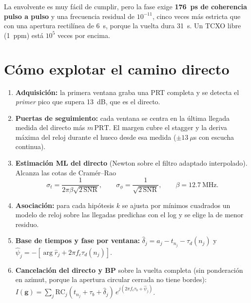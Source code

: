 \documentclass[11pt,a4paper]{article}
\begin{document}
La envolvente es muy fácil de cumplir, pero la fase exige \textbf{176~ps
de coherencia pulso a pulso} y una frecuencia residual de $10^{-11}$, cinco
veces más estricta que con una apertura rectilínea de 6~s, porque la vuelta
dura 31~s. Un TCXO libre (1~ppm) está $10^5$ veces por encima.

\section{Cómo explotar el camino directo}
\label{sec:alg}

\begin{enumerate}
\item \textbf{Adquisición:} la primera ventana graba una PRT completa y se
  detecta el \emph{primer} pico que supera 13~dB, que es el directo.
\item \textbf{Puertas de seguimiento:} cada ventana se centra en la última
  llegada medida del directo más $m\,\mathrm{PRT}$. El margen cubre el
  stagger y la deriva máxima del reloj durante el hueco desde esa medida
  ($\pm13~\mu$s con escucha continua).
\item \textbf{Estimación ML del directo} (Newton sobre el filtro adaptado
  interpolado). Alcanza las cotas de Cramér--Rao
  \begin{equation}
  \sigma_t=\frac{1}{2\pi\beta\sqrt{2\,\mathrm{SNR}}},\qquad
  \sigma_\phi=\frac{1}{\sqrt{2\,\mathrm{SNR}}},\qquad \beta=12.7~\text{MHz}.
  \end{equation}
\item \textbf{Asociación:} para cada hipótesis $k$ se ajusta por mínimos
  cuadrados un modelo de reloj sobre las llegadas predichas con el log y se
  elige la de menor residuo.
\item \textbf{Base de tiempos y fase por ventana:}
  $\hat\delta_j=\hat a_j-t_{n_j}-\tau_d(n_j)$ y
  $\hat\psi_j=-[\arg\hat r_j+2\pi f_c\tau_d(n_j)]$.
\item \textbf{Cancelación del directo y BP} sobre la vuelta completa (sin
  ponderación en azimut, porque la apertura circular cerrada no tiene bordes):
  $I(\mathbf g)=\sum_j\mathrm{RC}_j(t_{n_j}+\tau_b+\hat\delta_j)\,e^{j(2\pi f_c\tau_b+\hat\psi_j)}$.
\end{enumerate}
\end{document}
